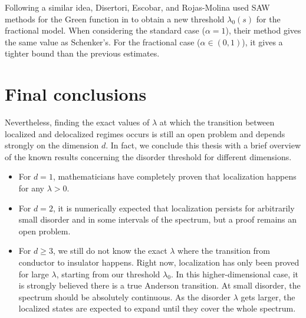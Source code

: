 \documentclass[11pt, a4paper, UKenglish, oneside]{book}
\theoremstyle{plain}
\theoremstyle{remark}
\theoremstyle{definition}
\numberwithin{equation}{section}
\numberwithin{theorem}{section}
\begin{document}
Following a similar idea, Disertori, Escobar, and Rojas-Molina used SAW methods for the Green function in \cite{disertori2024} to obtain a new threshold $\lambda_0(s)$ for the fractional model. When considering the standard case ($\alpha=1$), their method gives the same value as Schenker's. For the fractional case ($\alpha \in (0,1)$), it gives a tighter bound than the previous estimates.\\



\section{Final conclusions}
Nevertheless, finding the exact values of $\lambda$ at which the transition between localized and delocalized regimes occurs is still an open problem and depends strongly on the dimension $d$. In fact, we conclude this thesis with a brief overview of the known results concerning the disorder threshold for different dimensions.

\begin{itemize}
    \item For $d=1$, mathematicians have completely proven that localization happens for any $\lambda>0$.
    \item For $d=2$, it is numerically expected that localization persists for arbitrarily small disorder and in some intervals of the spectrum, but a proof remains an open problem.
    \item For $d \ge 3$, we still do not know the exact $\lambda$ where the transition from conductor to insulator happens. Right now, localization has only been proved for large $\lambda$, starting from our threshold $\lambda_0$. In this higher-dimensional case, it is strongly believed there is a true Anderson transition. At small disorder, the spectrum should be absolutely continuous. As the disorder $\lambda$ gets larger, the localized states are expected to expand until they cover the whole spectrum. 
\end{itemize}

\clearpage
{}
\nocite{*}

\end{document}
